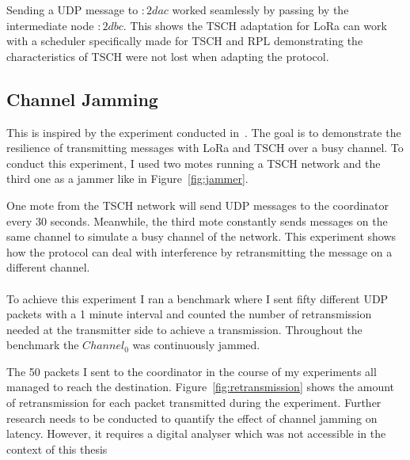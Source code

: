 Sending a UDP message to $:2dac$ worked seamlessly by passing by the
intermediate node $:2dbc$.
This shows the TSCH adaptation for LoRa can work with a scheduler specifically
made for TSCH and RPL demonstrating the characteristics of TSCH were not lost when
adapting the protocol.

\subsection{Channel Jamming\label{section:jamming}}

This is inspired by the experiment conducted in~\cite{tschoverlora}.
The goal is to demonstrate the resilience of transmitting messages with LoRa and
TSCH over a busy channel.
To conduct this experiment, I used two motes running a TSCH network and the third one
as a jammer like in Figure~\ref{fig:jammer}.



One mote from the TSCH network will send UDP messages to the coordinator
every 30 seconds.
Meanwhile, the third mote constantly sends messages on the same channel to
simulate a busy channel of the network.
This experiment shows how the protocol can deal with interference by retransmitting
the message on a different channel.

\paragraph{}

To achieve this experiment I ran a benchmark where I sent fifty different UDP packets
with a 1 minute interval and counted the number of retransmission needed at
the transmitter side to achieve a transmission.
Throughout the benchmark the $Channel_0$ was continuously jammed.

The 50 packets I sent to the coordinator in the course of my experiments
all managed to reach the destination.
Figure~\ref{fig:retransmission} shows the amount of retransmission for each
packet transmitted during the experiment.
Further research needs to be conducted to quantify the effect of channel
jamming on latency. However, it requires a digital analyser which was not
accessible in the context of this thesis

